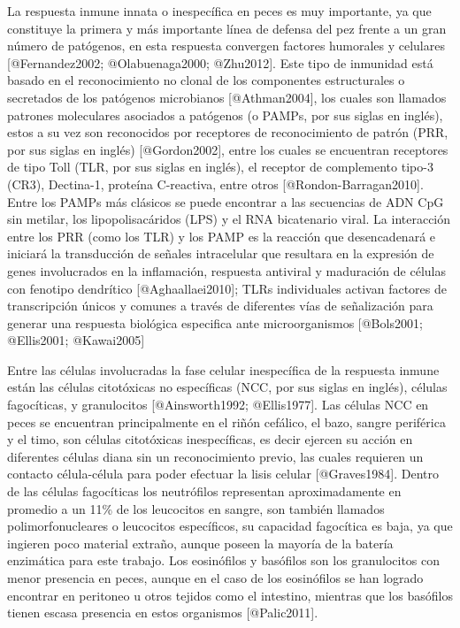La respuesta inmune innata o inespecífica en peces es muy importante, ya que constituye la primera y más importante línea de defensa del pez frente a un gran número de patógenos, en esta respuesta convergen factores humorales y celulares [@Fernandez2002; @Olabuenaga2000; @Zhu2012]. Este tipo de inmunidad está basado en el reconocimiento no clonal de los componentes estructurales o secretados de los patógenos microbianos [@Athman2004]⁠, los cuales son llamados patrones moleculares asociados a patógenos (o PAMPs, por sus siglas en inglés), estos a su vez son reconocidos por receptores de reconocimiento de patrón (PRR, por sus siglas en inglés) [@Gordon2002], entre los cuales se encuentran receptores de tipo Toll (TLR, por sus siglas en inglés), el receptor de complemento tipo-3 (CR3), Dectina-1, proteína C-reactiva, entre otros [@Rondon-Barragan2010]. Entre los PAMPs más clásicos se puede encontrar a las secuencias de ADN CpG sin metilar, los lipopolisacáridos (LPS) y el RNA bicatenario viral. La interacción entre los PRR (como los TLR) y los PAMP es la reacción que desencadenará e iniciará la transducción de señales intracelular que resultara en la expresión de genes involucrados en la inflamación, respuesta antiviral y maduración de células con fenotipo dendrítico [@Aghaallaei2010]⁠; TLRs individuales activan factores de transcripción únicos y comunes a través de diferentes vías de señalización para generar una respuesta biológica especifica ante microorganismos [@Bols2001; @Ellis2001; @Kawai2005]

Entre las células involucradas la fase celular inespecífica de la respuesta inmune están las células citotóxicas no específicas (NCC, por sus siglas en inglés), células fagocíticas, y granulocitos [@Ainsworth1992; @Ellis1977]. Las células NCC en peces se encuentran principalmente en el riñón cefálico, el bazo, sangre periférica y el timo, son células citotóxicas inespecíficas, es decir ejercen su acción en diferentes células diana sin un reconocimiento previo, las cuales requieren un contacto célula-célula para poder efectuar la lisis celular [@Graves1984]. Dentro de las células fagocíticas los neutrófilos representan aproximadamente en promedio a un 11\% de los leucocitos en sangre, son también llamados polimorfonucleares o leucocitos específicos, su capacidad fagocítica es baja, ya que ingieren poco material extraño, aunque poseen la mayoría de la batería enzimática para este trabajo. Los eosinófilos y basófilos son los granulocitos con menor presencia en peces, aunque en el caso de los eosinófilos se han logrado encontrar en peritoneo u otros tejidos como el intestino, mientras que los basófilos tienen escasa presencia en estos organismos [@Palic2011].

